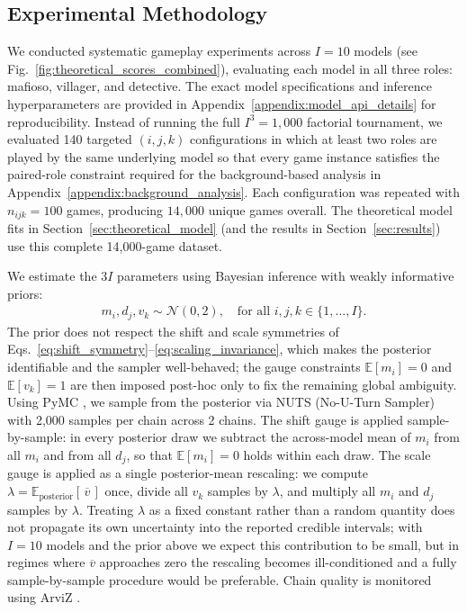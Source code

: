 \documentclass{article}
\begin{document}
\subsection{Experimental Methodology}
\label{sec:experimental_methodology}

We conducted systematic gameplay experiments across $I=10$ models (see Fig.~\ref{fig:theoretical_scores_combined}), evaluating each model in all three roles: mafioso, villager, and detective. The exact model specifications and inference hyperparameters are provided in Appendix~\ref{appendix:model_api_details} for reproducibility. Instead of running the full $I^3=1{,}000$ factorial tournament, we evaluated 140 targeted $(i,j,k)$ configurations in which at least two roles are played by the same underlying model so that every game instance satisfies the paired-role constraint required for the background-based analysis in Appendix~\ref{appendix:background_analysis}. Each configuration was repeated with $n_{ijk}=100$ games, producing $14{,}000$ unique games overall. The theoretical model fits in Section~\ref{sec:theoretical_model} (and the results in Section~\ref{sec:results}) use this complete 14,000-game dataset.

We estimate the $3I$ parameters using Bayesian inference with weakly informative priors:
\begin{align}
m_i, d_j, v_k \sim \mathcal{N}(0, 2), \quad \text{for all } i, j, k \in \{1, \ldots, I\}.
\label{eq:bayesian_inference}
\end{align}
The prior does not respect the shift and scale symmetries of Eqs.~\eqref{eq:shift_symmetry}--\eqref{eq:scaling_invariance}, which makes the posterior identifiable and the sampler well-behaved; the gauge constraints $\mathbb{E}[m_i]=0$ and $\mathbb{E}[v_k]=1$ are then imposed post-hoc only to fix the remaining global ambiguity. Using PyMC \citep{pymc2023}, we sample from the posterior via NUTS (No-U-Turn Sampler) with 2,000 samples per chain across 2 chains. The shift gauge is applied sample-by-sample: in every posterior draw we subtract the across-model mean of $m_i$ from all $m_i$ and from all $d_j$, so that $\mathbb{E}[m_i]=0$ holds within each draw. The scale gauge is applied as a single posterior-mean rescaling: we compute $\lambda=\mathbb{E}_{\text{posterior}}\!\left[\,\overline{v}\,\right]$ once, divide all $v_k$ samples by $\lambda$, and multiply all $m_i$ and $d_j$ samples by $\lambda$. Treating $\lambda$ as a fixed constant rather than a random quantity does not propagate its own uncertainty into the reported credible intervals; with $I=10$ models and the prior above we expect this contribution to be small, but in regimes where $\overline{v}$ approaches zero the rescaling becomes ill-conditioned and a fully sample-by-sample procedure would be preferable. Chain quality is monitored using ArviZ \citep{arviz2019}.
\end{document}
